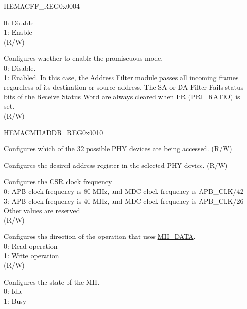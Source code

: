 \begin{register}{H}{EMACFF\_REG}{0x0004}
\begin{regdesc}
\begin{reglist}
0: Disable\\
1: Enable\\
(R/W)
\item [PMODE] Configures whether to enable the promiscuous mode.\\
0: Disable.\\
1: Enabled. In this case, the Address Filter module passes all incoming frames regardless of its destination or source address. The SA or DA Filter Fails status bits of the Receive Status Word are always cleared when PR (PRI\_RATIO) is set.\\(R/W)
\end{reglist}\end{regdesc}
\end{register}

\begin{register}{H}{EMACMIIADDR\_REG}{0x0010}\label{regdesc:EMACMIIADDRREG}
%
%
%
%
%
%
\regnewline%
\begin{regdesc}\begin{reglist}
\item [MIIDEV] Configures which of the 32 possible PHY devices are being accessed. (R/W)
\item [MIIREG]\label{fielddesc:MIIREG} Configures the desired address register in the selected PHY device.  (R/W)
\item  [MIICSRCLK]\label{fielddesc:MIICSRCLK} Configures the CSR clock frequency.\\
0: APB clock frequency is 80 MHz, and MDC clock frequency is APB\_CLK/42\\
3: APB clock frequency is 40 MHz, and MDC clock frequency is APB\_CLK/26\\
Other values are reserved\\(R/W) 
\item [MIIWRITE] Configures the direction of the operation that uses \hyperref[regdesc:EMACMIIDATAREG]{MII\_DATA}.\\
0: Read operation\\
1: Write operation\\(R/W)
\item [MIIBUSY]\label{fielddesc:MIIBUSY} Configures the state of the MII.\\
0: Idle\\
1: Busy\\

\end{reglist}
\end{regdesc}
\end{register}
